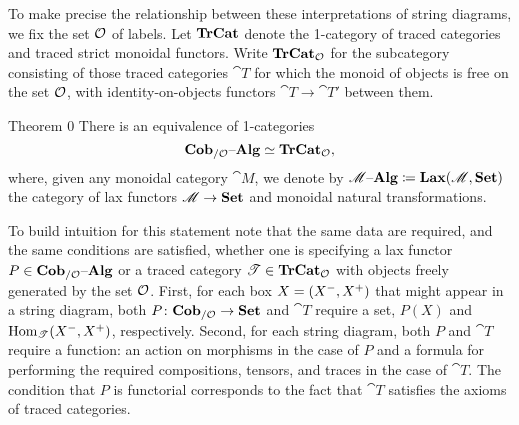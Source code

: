 \documentclass[11pt,oneside,article]{memoir}
\begin{document}
To make precise the relationship between these interpretations of string diagrams, we fix the set
$\mathcal{O}$ of labels. Let $\mathbf{TrCat}$ denote the 1-category of traced categories and traced strict
monoidal functors. Write $\mathbf{TrCat}_{\mathcal{O}}$ for the subcategory consisting of those traced categories $\cat{T}$ for which the monoid of objects is free on the set $\mathcal{O}$, with identity-on-objects functors $\cat{T}\to\cat{T}'$ between them.

\begin{named}{Theorem 0}
    \label{thm:traced_is_cob_alg}
  There is an equivalence of 1-categories
  \begin{equation}
      \label{eq:single_fiber_tr}
    \mathbf{Cob}_{/\mathcal{O}}{\text \textendash}\mathbf{Alg}\simeq\mathbf{TrCat}_{\mathcal{O}},
  \end{equation}
  where, given any monoidal category $\cat{M}$, we denote by
  $\mathscr{M}{\text \textendash}\mathbf{Alg}\coloneqq\mathbf{Lax}(\mathscr{M},\mathbf{Set})$ the category of lax functors $\mathscr{M}\to\mathbf{Set}$ and monoidal natural transformations.
\end{named}

To build intuition for this statement note that the same data are required, and the same conditions
are satisfied, whether one is specifying a lax functor $P\in\mathbf{Cob}_{/\mathcal{O}}{\text \textendash}\mathbf{Alg}$ or a traced category
$\mathscr{T}\in\mathbf{TrCat}_{\mathcal{O}}$ with objects freely generated by the set $\mathcal{O}$. First, for each box
$X=(X^-,X^+)$ that might appear in a string diagram, both $P\colon\mathbf{Cob}_{/\mathcal{O}}\to\mathbf{Set}$
and $\cat{T}$ require a set, $P(X)$ and $\operatorname{Hom}_{\mathscr{T}}(X^-,X^+)$, respectively. Second,
for each string diagram, both $P$ and $\cat{T}$ require a function: an action on morphisms in the
case of $P$ and a formula for performing the required compositions, tensors, and traces in the case
of $\cat{T}$. The condition that $P$ is functorial corresponds to the fact that $\cat{T}$ satisfies
the axioms of traced categories.
\end{document}
